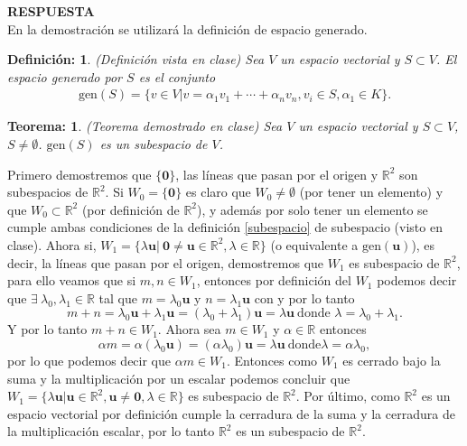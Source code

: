\documentclass[11pt,letterpaper]{article}
\newcommand{\mR}{\mathbb{R}}
\newcommand{\res}{\textbf{RESPUESTA}\\}
\newcommand{\gen}{\text{gen}}
\newtheorem{thmt}{Teorema:}
\newtheorem{thmd}{Definición:}
\begin{document}
\begin{enumerate}
\res 
En la demostración se utilizará la definición de espacio generado. 
\begin{framed}
    \begin{thmd} \label{espacio_generado}
    (Definición vista en clase) Sea $V$ un espacio vectorial y $S\subset V$. El espacio generado por $S$ es el conjunto
    \begin{align*}
    \gen (S)=\{v\in V| v=\alpha_1 v_1+\cdots +\alpha_n v_n, v_i\in S, \alpha_1\in K \}. 
    \end{align*}
    \end{thmd}
\end{framed} 
\begin{framed}
    \begin{thmt} \label{espacio_generado_sub}
    (Teorema demostrado en clase) Sea $V$ un espacio vectorial y $S\subset V$, $S\neq \emptyset$. $\gen(S)$ es un subespacio de $V$. 
    \end{thmt}
\end{framed}
Primero demostremos que $\{\textbf{0}\}$, las líneas que pasan por el origen y $\mR^2$ son subespacios de $\mR^2$. Si $W_0=\{\textbf{0}\}$ es claro que $W_0\neq \emptyset$ (por tener un elemento) y que $W_0\subset \mR^2$ (por definición de $\mR^2$), y además por solo tener un elemento se cumple ambas condiciones de la definición \ref{subespacio} de subespacio (visto en clase). Ahora si, $W_1=\{\lambda\textbf{u}|\ \textbf{0}\neq \textbf{u}\in \mR^2, \lambda\in \mR\}$ (o equivalente a $\gen (\textbf{u})$), es decir, la líneas que pasan por el origen, demostremos que $W_1$ es subespacio de $\mR^2$, para ello veamos que si $m,n\in W_1$, entonces por definición del $W_1$ podemos decir que $\exists \ \lambda_0, \lambda_1\in \mR$ tal que  $m=\lambda_0\textbf{u}$ y $n=\lambda_1\textbf{u}$ con  y por lo tanto
$$m+n=\lambda_0\textbf{u}+\lambda_1\textbf{u}=(\lambda_0+\lambda_1)\textbf{u}=\lambda\textbf{u} \ \text{donde }\lambda=\lambda_0+\lambda_1.$$
Y por lo tanto $m+n\in W_1.$ Ahora sea $m\in W_1$ y $\alpha \in \mR$ entonces
$$\alpha m=\alpha (\lambda_0\textbf{u})=(\alpha \lambda_0)\textbf{u}=\lambda \textbf{u} \ \text{donde} \lambda=\alpha \lambda_0,$$
por lo que podemos decir que $\alpha m\in W_1$. Entonces como $W_1$ es cerrado bajo la suma y la multiplicación por un escalar podemos concluir que $W_1=\{\lambda\textbf{u}| \textbf{u}\in \mR^2, \textbf{u}\neq \textbf{0}, \lambda\in \mR\}$ es subespacio de $\mR^2$. Por último, como $\mR^2$ es un espacio vectorial por definición cumple la cerradura de la suma y la cerradura de la multiplicación escalar, por lo tanto $\mR^2$ es un subespacio de $\mR^2.$ \\


\end{enumerate}
\end{document}
